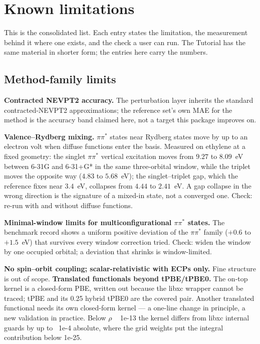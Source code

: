\chapter{Known limitations}
\label{ch:limitations}

This is the consolidated list.  Each entry states the limitation, the
measurement behind it where one exists, and the check a user can run.
The Tutorial has the same material in shorter form; the entries here
carry the numbers.

\section{Method-family limits}

\textbf{Contracted NEVPT2 accuracy.}  The perturbation layer inherits
the standard contracted-NEVPT2 approximations; the reference set's own
MAE for the method is the accuracy band claimed here, not a target
this package improves on.

\textbf{Valence--Rydberg mixing.}  $\pi\pi^*$ states near Rydberg
states move by up to an electron volt when diffuse functions enter
the basis.  Measured on ethylene at a fixed geometry: the singlet
$\pi\pi^*$ vertical excitation moves from $9.27$ to $8.09$~eV between
6-31G and 6-31+G* in the same three-orbital window, while the triplet
moves the opposite way ($4.83$ to $5.68$~eV); the singlet--triplet
gap, which the reference fixes near $3.4$~eV, collapses from $4.44$
to $2.41$~eV.  A gap collapse in the wrong direction is the signature
of a mixed-in state, not a converged one.  Check: re-run with and
without diffuse functions.

\textbf{Minimal-window limits for multiconfigurational
$\pi\pi^*$ states.}  The benchmark record shows a uniform positive
deviation of the $\pi\pi^*$ family ($+0.6$ to $+1.5$~eV) that
survives every window correction tried.  Check: widen the window by
one occupied orbital; a deviation that shrinks is window-limited.

\textbf{No spin--orbit coupling; scalar-relativistic with ECPs only.}
Fine structure is out of scope.
\textbf{Translated functionals beyond tPBE/tPBE0.}  The on-top kernel is a closed-form PBE, written out because the libxc wrapper cannot be traced; tPBE and its 0.25 hybrid tPBE0 are the covered pair.  Another translated functional needs its own closed-form kernel --- a one-line change in principle, a new validation in practice.  Below $\rho$ ~ 1e-13 the kernel differs from libxc internal guards by up to ~1e-4 absolute, where the grid weights put the integral contribution below 1e-25.


